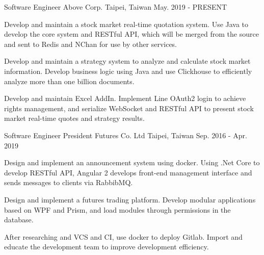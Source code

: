 

\begin{cventries}

  \cventry
    {Software Engineer} %
    {Above Corp.} %
    {Taipei, Taiwan} %
    {May. 2019 - PRESENT} %
    {
      \begin{cvitems} %
        \item {Develop and maintain a stock market real-time quotation system. Use Java to develop the core system and RESTful API, which will be merged from the source and sent to Redis and NChan for use by other services.}
        \item {Develop and maintain a strategy system to analyze and calculate stock market information. Develop business logic using Java and use Clickhouse to efficiently analyze more than one billion documents.}
        \item {Develop and maintain Excel AddIn. Implement Line OAuth2 login to achieve rights management, and serialize WebSocket and RESTful API to present stock market real-time quotes and strategy results.}
      \end{cvitems}
    }

  \cventry
    {Software Engineer} %
    {President Futures Co. Ltd} %
    {Taipei, Taiwan} %
    {Sep. 2016 - Apr. 2019} %
    {
      \begin{cvitems} %
        \item {Design and implement an announcement system using docker. Using .Net Core to develop RESTful API, Angular 2 develops front-end management interface and sends messages to clients via RabbibMQ.}
        \item {Design and implement a futures trading platform. Develop modular applications based on WPF and Prism, and load modules through permissions in the database.}
        \item {After researching and VCS and CI, use docker to deploy Gitlab. Import and educate the development team to improve development efficiency.}
      \end{cvitems}
    }

\end{cventries}
